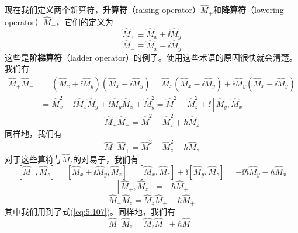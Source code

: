     现在我们定义两个新算符，\textbf{升算符}（raising operator）$\hat{M}_+$和\textbf{降算符}（lowering operator）$\hat{M}_-$，它们的定义为
    \begin{equation}
        \hat{M}_+ \equiv \hat{M}_x + \ii \hat{M}_y
        \label{eq:5.110}
    \end{equation}
    \begin{equation}
        \hat{M}_- \equiv \hat{M}_x - \ii \hat{M}_y
        \label{eq:5.111}
    \end{equation}
    这些是\textbf{阶梯算符}（ladder operator）的例子。使用这些术语的原因很快就会清楚。我们有
    \begin{equation*}
        \begin{aligned}
            \hat{M}_+\hat{M}_- & = \left(\hat{M}_x+\ii \hat{M}_y\right)\left(\hat{M}_x-\ii \hat{M}_y\right) = \hat{M}_x\left(\hat{M}_x-\ii \hat{M}_y\right) + \ii \hat{M}_y\left(\hat{M}_x-\ii \hat{M}_y\right) \\
            & = \hat{M}_x^2 - \ii \hat{M}_x\hat{M}_y + \ii \hat{M}_y\hat{M}_x + \hat{M}_y^2 = \hat{M}^2 - \hat{M}_z^2 + \ii \left[\hat{M}_y,\hat{M}_x\right]
        \end{aligned}
    \end{equation*}
    \begin{equation}
        \hat{M}_+\hat{M}_- = \hat{M}^2 - \hat{M}_z^2 + \hbar\hat{M}_z
        \label{eq:5.112}
    \end{equation}
    同样地，我们有
    \begin{equation}
        \hat{M}_-\hat{M}_+ = \hat{M}^2 - \hat{M}_z^2 - \hbar\hat{M}_z
        \label{eq:5.113}
    \end{equation}
    对于这些算符与$\hat{M}_z$的对易子，我们有
    \begin{equation*}
        \left[\hat{M}_+,\hat{M}_z\right] = \left[\hat{M}_x+\ii \hat{M}_y,\hat{M}_z\right] = \left[\hat{M}_x,\hat{M}_z\right]+\ii \left[\hat{M}_y,\hat{M}_z\right] = -\ii \hbar\hat{M}_y - \hbar\hat{M}_x
    \end{equation*}
    \begin{equation*}
        \left[\hat{M}_+,\hat{M}_z\right] = -\hbar\hat{M}_+
    \end{equation*}
    \begin{equation}
        \hat{M}_+\hat{M}_z = \hat{M}_z\hat{M}_+ - \hbar\hat{M}_+
        \label{eq:5.114}
    \end{equation}
    其中我们用到了式(\ref{eq:5.107})。同样地，我们有
    \begin{equation}
        \hat{M}_-\hat{M}_z = \hat{M}_z\hat{M}_- + \hbar\hat{M}_-
        \label{eq:5.115}
    \end{equation}

